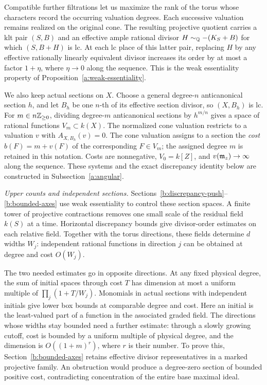 Compatible further filtrations let us maximize the rank of the torus
whose characters record the occurring valuation degrees. Each successive
valuation remains realized on the original cone. The resulting projective quotient carries a
klt pair $(S,B)$ and an effective ample rational divisor
$H\sim_{\mathbb Q}-(K_S+B)$ for which $(S,B+H)$ is lc. At each lc place of
this latter pair, replacing $H$ by any effective rationally linearly
equivalent divisor increases its order by at most a factor $1+\eta$,
where $\eta\to0$ along the sequence. This is the weak
essentiality property of Proposition~\ref{a:weak-essentiality}.

We also keep actual sections on $X$. Choose a general degree-$n$
anticanonical section $h$, and let $B_h$ be one $n$-th of its effective
section divisor, so $(X,B_h)$ is lc. For $m\in n\mathbb Z_{\ge0}$, dividing
degree-$m$ anticanonical sections by $h^{m/n}$ gives a space of rational
functions $V_m\subset k(X)$. The normalized cone valuation restricts to
a valuation $v$ with $A_{X,B_h}(v)=0$. The cone valuation assigns to a
section the \emph{cost} $b(F)=m+v(F)$ of the corresponding
$F\in V_m$; the assigned
degree $m$ is retained in this notation. Costs are nonnegative,
$V_0=k[Z]$, and $v(\mathfrak m_z)\to\infty$ along the sequence.
These systems and the exact
discrepancy identity below are constructed in
Subsection~\ref{a:angular}.

\smallskip\noindent
\emph{Upper counts and independent sections.}
Sections~\ref{b:discrepancy-push}--\ref{b:bounded-axes} use weak
essentiality to control these section spaces. A finite tower of projective
contractions removes one small scale of the residual field $k(S)$ at a time.
Horizontal discrepancy bounds give divisor-order estimates on each
relative field. Together with the torus directions, these fields determine
$d$ widths $W_j$: independent rational functions in direction $j$ can be
obtained at degree and cost $O(W_j)$.

The two needed estimates go in opposite directions. At any fixed physical
degree, the sum of initial spaces through cost $T$ has dimension at most
a uniform multiple of $\prod_j(1+T/W_j)$. Monomials in actual sections
with independent initials give lower box bounds at comparable degree and
cost. Here an
initial is the least-valued part of a function in the associated graded
field. The directions whose widths stay bounded need a further estimate:
through a slowly growing cutoff, cost is bounded by a uniform multiple
of physical degree, and
the dimension is $O((1+m)^r)$, where $r$ is their number. To prove this,
Section~\ref{b:bounded-axes} retains effective divisor representatives in
a marked projective family. An obstruction would produce a degree-zero
section of bounded positive cost, contradicting concentration of the
entire base maximal ideal.

